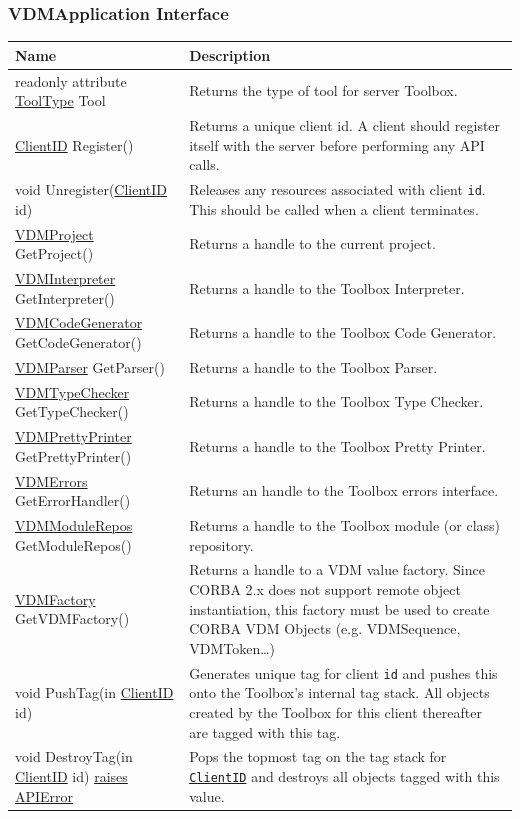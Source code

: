 \documentclass[\pformat,12pt]{article}
\newcommand{\pbs}[1]{\let\temp=\\#1\let\\=\temp}
\newenvironment{interfacetable}{%
  \begin{longtable}{|>{\pbs\raggedright\ttfamily}p{6.6cm}%
                    |>{\pbs\raggedright}p{6.6cm}|} \hline
  \textrm{\bfseries Name} &  \textbf{Description} \\ \hline
  \endhead
  }{\end{longtable}}
\newcommand{\APIError}{\hyperlink{exception.APIError}{raises APIError}}
\newcommand{\ToolType}{\hyperlink{type.ToolType}{ToolType}}
\newcommand{\VDMCodeGenerator}{\hyperlink{interface.VDMCodeGenerator}{VDMCodeGenerator}}
\newcommand{\VDMErrors}{\hyperlink{interface.VDMErrors}{VDMErrors}}
\newcommand{\VDMInterpreter}{\hyperlink{interface.VDMInterpreter}{VDMInterpreter}}
\newcommand{\VDMModuleRepos}{\hyperlink{interface.VDMModuleRepos}{VDMModuleRepos}}
\newcommand{\VDMFactory}{\hyperlink{interface.VDMFactory}{VDMFactory}}
\newcommand{\VDMParser}{\hyperlink{interface.VDMParser}{VDMParser}}
\newcommand{\VDMPrettyPrinter}{\hyperlink{interface.VDMPrettyPrinter}{VDMPrettyPrinter}}
\newcommand{\VDMProject}{\hyperlink{interface.VDMProject}{VDMProject}}
\newcommand{\VDMTypeChecker}{\hyperlink{interface.VDMTypeChecker}{VDMTypeChecker}}
\newcommand{\ClientID}{\hyperlink{type.ClientID}{ClientID}}
\begin{document}
\subsubsection{VDMApplication Interface}
\mbox{}
\begin{interfacetable}
readonly attribute {\ToolType} Tool
  & Returns the type of tool for server Toolbox.
\\ \hline
{\ClientID} Register()
  & Returns a unique client id. A client should register itself with
    the server before performing any API calls.
\\ \hline
void Unregister({\ClientID} id)
  & Releases any resources associated with client \texttt{id}. This
    should be called when a client terminates.
\\ \hline
{\VDMProject} GetProject()
  & Returns a handle to the current project.
\\ \hline
{\VDMInterpreter} GetInterpreter()
  & Returns a handle to the Toolbox Interpreter.
\\ \hline
{\VDMCodeGenerator} GetCodeGenerator()
  & Returns a handle to the Toolbox Code Generator.
\\ \hline
{\VDMParser} GetParser()
  & Returns a handle to the Toolbox Parser.
\\ \hline
{\VDMTypeChecker} GetTypeChecker()
  & Returns a handle to the Toolbox Type Checker.
\\ \hline
{\VDMPrettyPrinter} GetPrettyPrinter()
  & Returns a handle to the Toolbox Pretty Printer.
\\ \hline
{\VDMErrors} GetErrorHandler()
  & Returns an handle to the Toolbox errors interface.
\\ \hline
{\VDMModuleRepos} GetModuleRepos()
  & Returns a handle to the Toolbox module (or class) repository.
\\ \hline
{\VDMFactory} GetVDMFactory()
  & Returns a handle to a VDM value factory. Since CORBA 2.x does
    not support remote object instantiation, this factory must be 
    used to create CORBA VDM Objects (e.g. VDMSequence, VDMToken\ldots)
\\ \hline
void PushTag(in {\ClientID} id)
  & Generates unique tag for client \texttt{id} and pushes this
    onto the Toolbox's internal tag stack. All objects created by the
    Toolbox for this client thereafter are tagged with this tag.
\\ \hline
void DestroyTag(in {\ClientID} id) \APIError
  & Pops the topmost tag on the tag stack for \texttt{{\ClientID}} and
    destroys all objects tagged with this value.
\\ \hline
\end{interfacetable}
\end{document}
